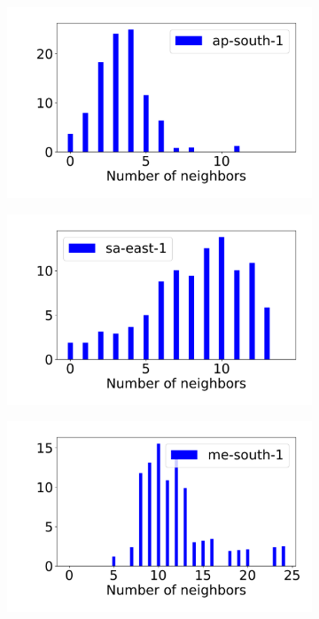 \begin{figure}[!t]
\begin{subfigure}{.33\textwidth}
  \centering
  \includegraphics[width=.99\linewidth]{fig/colocation-ap-south-1.pdf}
\end{subfigure}%
\begin{subfigure}{.33\textwidth}
  \centering
  \includegraphics[width=.99\linewidth]{fig/colocation-sa-east-1.pdf}
\end{subfigure}
\begin{subfigure}{.33\textwidth}
  \centering
  \includegraphics[width=.99\linewidth]{fig/colocation-me-south-1.pdf}

\end{subfigure}
\end{figure}
